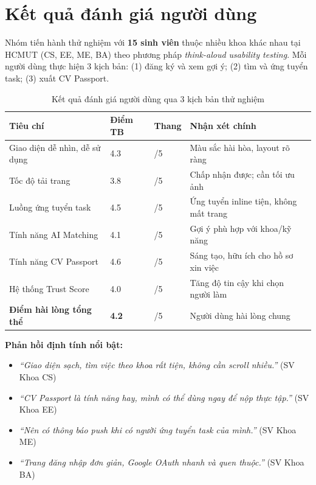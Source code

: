 
\section{Kết quả đánh giá người dùng}

Nhóm tiến hành thử nghiệm với \textbf{15 sinh viên} thuộc nhiều khoa khác nhau tại HCMUT
(CS, EE, ME, BA) theo phương pháp \textit{think-aloud usability testing}. Mỗi người dùng
thực hiện 3 kịch bản: (1) đăng ký và xem gợi ý; (2) tìm và ứng tuyển task; (3) xuất CV Passport.

\begin{table}[H]
\centering
\caption{Kết quả đánh giá người dùng qua 3 kịch bản thử nghiệm}
\renewcommand{\arraystretch}{1.2}
\begin{tabularx}{\textwidth}{|p{4.5cm}|p{2.2cm}|p{2.2cm}|X|}
\hline
\rowcolor{emeraldrow}
\textbf{\color{emeraldhead}Tiêu chí} &
\textbf{\color{emeraldhead}Điểm TB} &
\textbf{\color{emeraldhead}Thang} &
\textbf{\color{emeraldhead}Nhận xét chính} \\
\hline
Giao diện dễ nhìn, dễ sử dụng   & 4.3 & /5 & Màu sắc hài hòa, layout rõ ràng \\
\hline
Tốc độ tải trang                 & 3.8 & /5 & Chấp nhận được; cần tối ưu ảnh \\
\hline
Luồng ứng tuyển task             & 4.5 & /5 & Ứng tuyển inline tiện, không mất trang \\
\hline
Tính năng AI Matching            & 4.1 & /5 & Gợi ý phù hợp với khoa/kỹ năng \\
\hline
Tính năng CV Passport            & 4.6 & /5 & Sáng tạo, hữu ích cho hồ sơ xin việc \\
\hline
Hệ thống Trust Score             & 4.0 & /5 & Tăng độ tin cậy khi chọn người làm \\
\hline
\textbf{Điểm hài lòng tổng thể} & \textbf{4.2} & /5 & Người dùng hài lòng chung \\
\hline
\end{tabularx}
\end{table}

\textbf{Phản hồi định tính nổi bật:}
\begin{itemize}
  \item \textit{``Giao diện sạch, tìm việc theo khoa rất tiện, không cần scroll nhiều.''} (SV Khoa CS)
  \item \textit{``CV Passport là tính năng hay, mình có thể dùng ngay để nộp thực tập.''} (SV Khoa EE)
  \item \textit{``Nên có thông báo push khi có người ứng tuyển task của mình.''} (SV Khoa ME)
  \item \textit{``Trang đăng nhập đơn giản, Google OAuth nhanh và quen thuộc.''} (SV Khoa BA)
\end{itemize}

